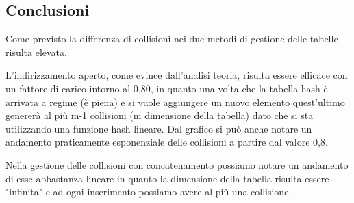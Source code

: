 \documentclass{article}
\begin{document}
\subsection{Conclusioni}
Come previsto la differenza di collisioni nei due metodi di gestione delle tabelle risulta elevata. 

L'indirizzamento aperto, come evince dall'analisi teoria, risulta essere efficace con un fattore di carico intorno al 0,80, in quanto una volta che la tabella hash è arrivata a regime (è piena) e si vuole aggiungere un nuovo elemento quest'ultimo genererà al più m-1 collisioni (m dimensione della tabella) dato che si sta utilizzando una funzione hash lineare. Dal grafico si può anche notare un andamento praticamente esponenziale delle collisioni a partire dal valore 0,8.

Nella gestione delle collisioni con concatenamento possiamo notare un andamento di esse abbastanza lineare in quanto la dimensione della tabella risulta essere "infinita" e ad ogni inserimento possiamo avere al più una collisione.
\end{document}
